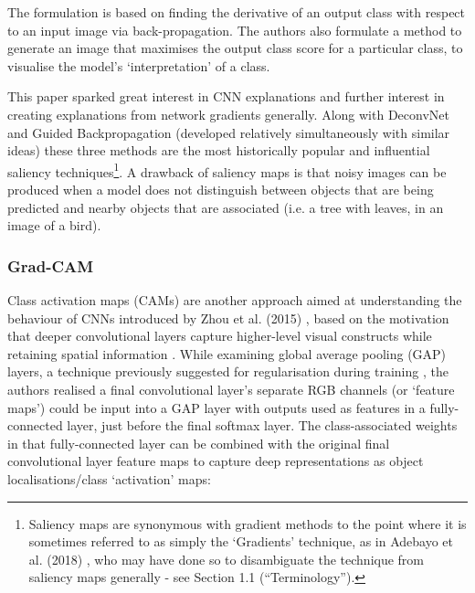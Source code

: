 \documentclass[main]{subfiles}
\begin{document}
The formulation is based on finding the derivative of an output class with respect to an input image via back-propagation. The authors also formulate a method to generate an image that maximises the output class score for a particular class, to visualise the model's `interpretation' of a class. 



This paper sparked great interest in CNN explanations and further interest in creating explanations from network gradients generally. Along with DeconvNet and Guided Backpropagation (developed relatively simultaneously with similar ideas) these three methods are the most historically popular and influential saliency techniques\footnote{Saliency maps are synonymous with gradient methods to the point where it is sometimes referred to as simply the `Gradients' technique, as in Adebayo et al. (2018) \cite{sanity}, who may have done so to disambiguate the technique from saliency maps generally - see Section 1.1 (``Terminology'').}. A drawback of saliency maps is that noisy images can be produced when a model does not distinguish between objects that are being predicted and nearby objects that are associated (i.e. a tree with leaves, in an image of a bird).

\subsubsection{Grad-CAM}
Class activation maps (CAMs) are another approach aimed at understanding the behaviour of CNNs introduced by Zhou et al. (2015) \cite{cam}, based on the motivation that deeper convolutional layers capture higher-level visual constructs while retaining spatial information \cite{gradcam}. While examining global average pooling (GAP) layers, a technique previously suggested for regularisation during training \cite{nin}, the authors realised a final convolutional layer's separate RGB channels (or `feature maps') could be input into a GAP layer with outputs used as features in a fully-connected layer, just before the final softmax layer. The class-associated weights in that fully-connected layer can be combined with the original final convolutional layer feature maps to capture deep representations as object localisations/class `activation' maps:
\end{document}
